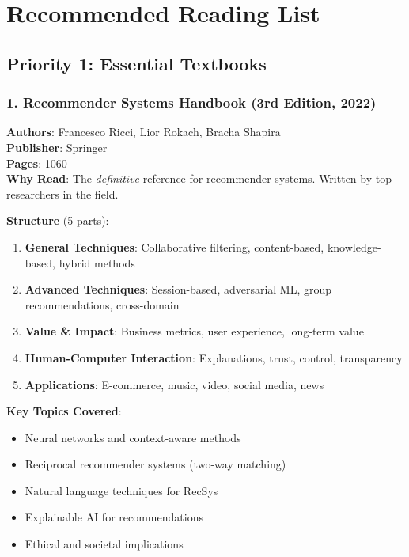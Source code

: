 \documentclass[10pt]{article}
\begin{document}
\section{Recommended Reading List}

\subsection{Priority 1: Essential Textbooks}

\subsubsection*{1. Recommender Systems Handbook (3rd Edition, 2022)}
\textbf{Authors}: Francesco Ricci, Lior Rokach, Bracha Shapira \\
\textbf{Publisher}: Springer \\
\textbf{Pages}: 1060 \\
\textbf{Why Read}: The \textit{definitive} reference for recommender systems. Written by top researchers in the field.

\textbf{Structure} (5 parts):
\begin{enumerate}[leftmargin=*]
    \item \textbf{General Techniques}: Collaborative filtering, content-based, knowledge-based, hybrid methods
    \item \textbf{Advanced Techniques}: Session-based, adversarial ML, group recommendations, cross-domain
    \item \textbf{Value \& Impact}: Business metrics, user experience, long-term value
    \item \textbf{Human-Computer Interaction}: Explanations, trust, control, transparency
    \item \textbf{Applications}: E-commerce, music, video, social media, news
\end{enumerate}

\textbf{Key Topics Covered}:
\begin{itemize}[leftmargin=*]
    \item Neural networks and context-aware methods
    \item Reciprocal recommender systems (two-way matching)
    \item Natural language techniques for RecSys
    \item Explainable AI for recommendations
    \item Ethical and societal implications
\end{itemize}
\end{document}
